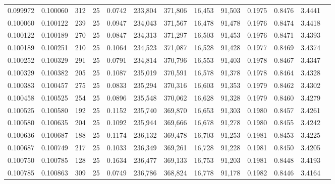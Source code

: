 \begin{tabular}{rrrrrrrrrrrrr}
0.099972 & 0.100060 &   312 &  25 &                                     0.0742 & 233,804 & 371,806 &  16,453 &  91,503 & 0.1975 & 0.8476 & 3.4441 \\
0.100060 & 0.100122 &   239 &  25 &                                     0.0947 & 234,043 & 371,567 &  16,478 &  91,478 & 0.1976 & 0.8474 & 3.4418 \\
0.100122 & 0.100189 &   270 &  25 &                                     0.0847 & 234,313 & 371,297 &  16,503 &  91,453 & 0.1976 & 0.8471 & 3.4393 \\
0.100189 & 0.100251 &   210 &  25 &                                     0.1064 & 234,523 & 371,087 &  16,528 &  91,428 & 0.1977 & 0.8469 & 3.4374 \\
0.100252 & 0.100329 &   291 &  25 &                                     0.0791 & 234,814 & 370,796 &  16,553 &  91,403 & 0.1978 & 0.8467 & 3.4347 \\
0.100329 & 0.100382 &   205 &  25 &                                     0.1087 & 235,019 & 370,591 &  16,578 &  91,378 & 0.1978 & 0.8464 & 3.4328 \\
0.100383 & 0.100457 &   275 &  25 &                                     0.0833 & 235,294 & 370,316 &  16,603 &  91,353 & 0.1979 & 0.8462 & 3.4302 \\
0.100458 & 0.100525 &   254 &  25 &                                     0.0896 & 235,548 & 370,062 &  16,628 &  91,328 & 0.1979 & 0.8460 & 3.4279 \\
0.100525 & 0.100580 &   192 &  25 &                                     0.1152 & 235,740 & 369,870 &  16,653 &  91,303 & 0.1980 & 0.8457 & 3.4261 \\
0.100580 & 0.100635 &   204 &  25 &                                     0.1092 & 235,944 & 369,666 &  16,678 &  91,278 & 0.1980 & 0.8455 & 3.4242 \\
0.100636 & 0.100687 &   188 &  25 &                                     0.1174 & 236,132 & 369,478 &  16,703 &  91,253 & 0.1981 & 0.8453 & 3.4225 \\
0.100687 & 0.100749 &   217 &  25 &                                     0.1033 & 236,349 & 369,261 &  16,728 &  91,228 & 0.1981 & 0.8450 & 3.4205 \\
0.100750 & 0.100785 &   128 &  25 &                                     0.1634 & 236,477 & 369,133 &  16,753 &  91,203 & 0.1981 & 0.8448 & 3.4193 \\
0.100785 & 0.100863 &   309 &  25 &                                     0.0749 & 236,786 & 368,824 &  16,778 &  91,178 & 0.1982 & 0.8446 & 3.4164 \\

\end{tabular}
